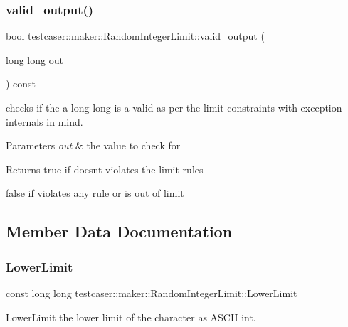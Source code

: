 \subsubsection{\texorpdfstring{valid\_output()}{valid\_output()}}
{\footnotesize\ttfamily bool testcaser\+::maker\+::\+Random\+Integer\+Limit\+::valid\+\_\+output (\begin{DoxyParamCaption}\item[{long long}]{out }\end{DoxyParamCaption}) const\hspace{0.3cm}{\ttfamily [inline]}}



checks if the a long long is a valid as per the limit constraints with exception internals in mind. 


\begin{DoxyParams}{Parameters}
{\em out} & the value to check for \\
\hline
\end{DoxyParams}
\begin{DoxyReturn}{Returns}
true if doesn\textquotesingle{}t violates the limit rules 

false if violates any rule or is out of limit 
\end{DoxyReturn}


\subsection{Member Data Documentation}
\mbox{\label{classtestcaser_1_1maker_1_1RandomIntegerLimit_ad564182c528cdc7a96443c4a4febe1c1}} 
\subsubsection{\texorpdfstring{LowerLimit}{LowerLimit}}
{\footnotesize\ttfamily const long long testcaser\+::maker\+::\+Random\+Integer\+Limit\+::\+Lower\+Limit}



Lower\+Limit the lower limit of the character as A\+S\+C\+II int. 

\mbox{\label{classtestcaser_1_1maker_1_1RandomIntegerLimit_a993debb42b11e472b19bcb2f2f5f2110}} 
